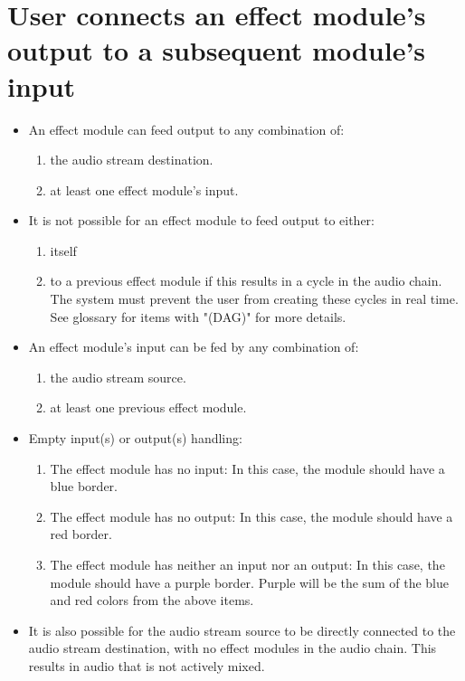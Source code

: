 \section{User connects an effect module's output to a subsequent module's input}


\begin{itemize}
	\item An effect module can feed output to any combination of:
	\begin{enumerate}
		\item the audio stream destination. 
		\item at least one effect module's input.
	\end{enumerate}
	
	\item It is not possible for an effect module to feed output to either:
	\begin{enumerate}
		\item itself
		\item to a previous effect module if this results in a cycle in the audio chain. The system must prevent the user from creating these cycles in real time. See glossary for items with "(DAG)" for more details.
	\end{enumerate}
	
	\item An effect module's input can be fed by any combination of:
	\begin{enumerate}
		\item the audio stream source.
		\item at least one previous effect module.
	\end{enumerate}


	\item Empty input(s) or output(s) handling:
	\begin{enumerate}
		\item The effect module has no input: In this case, the module should have a blue border.
		\item The effect module has no output: In this case, the module should have a red border.
		\item The effect module has neither an input nor an output: In this case, the module should have a purple border. Purple will be the sum of the blue and red colors from the above items.
	\end{enumerate}

	\item It is also possible for the audio stream source to be directly connected to the audio stream destination, with no effect modules in the audio chain. This results in audio that is not actively mixed.

	
	


\end{itemize}